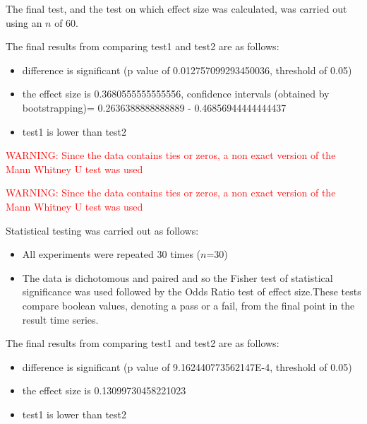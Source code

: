 \documentclass[]{article}
\begin{document}
The final test, and the test on which effect size was calculated, was carried out using an $n$ of 60. 

The final results from comparing test1 and test2 are as follows:
\begin{itemize}
\item{difference is significant (p value of 0.012757099293450036, threshold of 0.05)}
\item{the effect size is 0.3680555555555556, confidence intervals (obtained by bootstrapping)= 0.2636388888888889 - 0.46856944444444437}
\item{test1 is lower than test2}
\end{itemize}
\textcolor{Red}{WARNING: Since the data contains ties or zeros, a non exact version of the Mann Whitney U test was used
}

\textcolor{Red}{WARNING: Since the data contains ties or zeros, a non exact version of the Mann Whitney U test was used
}


Statistical testing was carried out as follows: 
\begin{itemize}
\item{All experiments were repeated 30 times ($n$=30)}
\item{The data is dichotomous and paired and so the Fisher test of statistical significance was used followed by the Odds Ratio test of effect size.These tests compare boolean values, denoting a pass or a fail, from the final point in the result time series. }
\end{itemize}
The final results from comparing test1 and test2 are as follows:
\begin{itemize}
\item{difference is significant (p value of 9.162440773562147E-4, threshold of 0.05)}
\item{the effect size is 0.13099730458221023}
\item{test1 is lower than test2}
\end{itemize}
\end{document}
